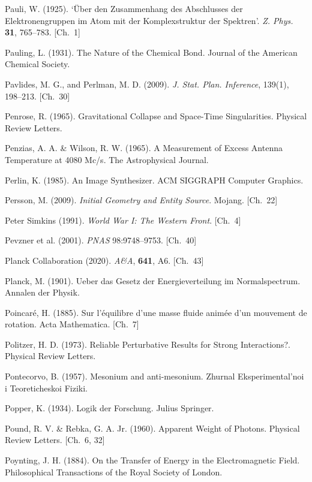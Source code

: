 \begin{list}{}{%
  \setlength{\leftmargin}{2em}%
  \setlength{\itemindent}{-2em}%
  \setlength{\itemsep}{0.35\baselineskip}%
  \setlength{\parsep}{0pt}%
  \setlength{\topsep}{0.5em}}
\item Pauli, W. (1925). `Über den Zusammenhang des Abschlusses der Elektronengruppen im Atom mit der Komplexstruktur der Spektren'. \textit{Z. Phys.} \textbf{31}, 765–783. \hfill {\scriptsize [Ch.~1]}
\item Pauling, L. (1931). The Nature of the Chemical Bond. Journal of the American Chemical Society.
\item Pavlides, M. G., and Perlman, M. D. (2009). \textit{J. Stat. Plan. Inference}, 139(1), 198–213. \hfill {\scriptsize [Ch.~30]}
\item Penrose, R. (1965). Gravitational Collapse and Space-Time Singularities. Physical Review Letters.
\item Penzias, A. A. \& Wilson, R. W. (1965). A Measurement of Excess Antenna Temperature at 4080 Mc/s. The Astrophysical Journal.
\item Perlin, K. (1985). An Image Synthesizer. ACM SIGGRAPH Computer Graphics.
\item Persson, M. (2009). \textit{Initial Geometry and Entity Source}. Mojang. \hfill {\scriptsize [Ch.~22]}
\item Peter Simkins (1991). \textit{World War I: The Western Front}. \hfill {\scriptsize [Ch.~4]}
\item Pevzner et al. (2001). \textit{PNAS} 98:9748–9753. \hfill {\scriptsize [Ch.~40]}
\item Planck Collaboration (2020). \textit{A\&A}, \textbf{641}, A6. \hfill {\scriptsize [Ch.~43]}
\item Planck, M. (1901). Ueber das Gesetz der Energieverteilung im Normalspectrum. Annalen der Physik.
\item Poincaré, H. (1885). Sur l'équilibre d'une masse fluide animée d'un mouvement de rotation. Acta Mathematica. \hfill {\scriptsize [Ch.~7]}
\item Politzer, H. D. (1973). Reliable Perturbative Results for Strong Interactions?. Physical Review Letters.
\item Pontecorvo, B. (1957). Mesonium and anti-mesonium. Zhurnal Eksperimental'noi i Teoreticheskoi Fiziki.
\item Popper, K. (1934). Logik der Forschung. Julius Springer.
\item Pound, R. V. \& Rebka, G. A. Jr. (1960). Apparent Weight of Photons. Physical Review Letters. \hfill {\scriptsize [Ch.~6, 32]}
\item Poynting, J. H. (1884). On the Transfer of Energy in the Electromagnetic Field. Philosophical Transactions of the Royal Society of London.

\end{list}
